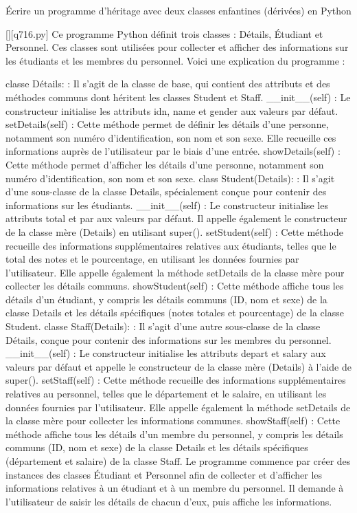         \question
        Écrire un programme d'héritage avec deux classes enfantines (dérivées) en Python
        \par
        \begin{solution}
            \renewcommand{\nomfichier}{q716.py}
            \pythonfile{\chemincode \nomfichier}[][\nomfichier]
            Ce programme Python définit trois classes : Détails, Étudiant et Personnel. Ces classes sont utilisées pour collecter et afficher des informations sur les étudiants et les membres du personnel. Voici une explication du programme :

    classe Détails: : Il s'agit de la classe de base, qui contient des attributs et des méthodes communs dont héritent les classes Student et Staff.
        \_\_init\_\_(self) : Le constructeur initialise les attributs idn, name et gender aux valeurs par défaut.
        setDetails(self) : Cette méthode permet de définir les détails d'une personne, notamment son numéro d'identification, son nom et son sexe. Elle recueille ces informations auprès de l'utilisateur par le biais d'une entrée.
        showDetails(self) : Cette méthode permet d'afficher les détails d'une personne, notamment son numéro d'identification, son nom et son sexe.
    class Student(Details): : Il s'agit d'une sous-classe de la classe Details, spécialement conçue pour contenir des informations sur les étudiants.
        \_\_init\_\_(self) : Le constructeur initialise les attributs total et par aux valeurs par défaut. Il appelle également le constructeur de la classe mère (Details) en utilisant super().
        setStudent(self) : Cette méthode recueille des informations supplémentaires relatives aux étudiants, telles que le total des notes et le pourcentage, en utilisant les données fournies par l'utilisateur. Elle appelle également la méthode setDetails de la classe mère pour collecter les détails communs.
        showStudent(self) : Cette méthode affiche tous les détails d'un étudiant, y compris les détails communs (ID, nom et sexe) de la classe Details et les détails spécifiques (notes totales et pourcentage) de la classe Student.
    classe Staff(Details): : Il s'agit d'une autre sous-classe de la classe Détails, conçue pour contenir des informations sur les membres du personnel.
        \_\_init\_\_(self) : Le constructeur initialise les attributs depart et salary aux valeurs par défaut et appelle le constructeur de la classe mère (Details) à l'aide de super().
        setStaff(self) : Cette méthode recueille des informations supplémentaires relatives au personnel, telles que le département et le salaire, en utilisant les données fournies par l'utilisateur. Elle appelle également la méthode setDetails de la classe mère pour collecter les informations communes.
        showStaff(self) : Cette méthode affiche tous les détails d'un membre du personnel, y compris les détails communs (ID, nom et sexe) de la classe Details et les détails spécifiques (département et salaire) de la classe Staff.
    Le programme commence par créer des instances des classes Étudiant et Personnel afin de collecter et d'afficher les informations relatives à un étudiant et à un membre du personnel. Il demande à l'utilisateur de saisir les détails de chacun d'eux, puis affiche les informations.


\end{solution}
